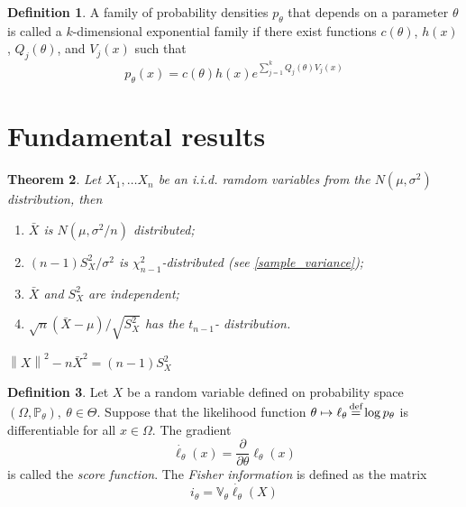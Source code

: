 \documentclass[12pt]{article}
\newtheorem{theorem}{Theorem}[section]
\theoremstyle{definition}
\newtheorem{definition}[theorem]{Definition}
\theoremstyle{remark}
\numberwithin{equation}{section}
\newcommand{\PP}{\mathbb{P}}
\newcommand{\VV}{\mathbb{V}}
\newcommand{\eq}{\stackrel{\mathclap{\normalfont\text{def}}}{=}}
\begin{document}
\begin{definition}\label{exponential_family}
	A family of probability densities $p_\theta$ that depends on a parameter $\theta$ is called a $k$-dimensional exponential family if there exist functions $c(\theta)$, $h(x)$, $Q_j(\theta)$, and $V_j(x)$ such that
	\begin{equation*}
		p_\theta(x) = c(\theta)h(x)e^{\sum_{j=1}^k Q_j(\theta)V_j(x)}
	\end{equation*}
\end{definition}

\section{Fundamental results}

\begin{theorem}\label{normaliid}
	Let $X_1,\ldots X_n$ be an i.i.d. ramdom variables from the $N(\mu, \sigma^2)$ distribution, then
	\begin{enumerate}
		\item $\bar X$ is $N(\mu, \sigma^2/n)$ distributed;
		\item $(n-1)S_X^2/\sigma^2$ is $\chi^2_{n-1}$-distributed (see \ref{sample_variance});
		\item $\bar X$ and $S^2_{X}$ are independent;
		\item $\sqrt{n}(\bar{X} - \mu)/\sqrt{S_X^2}$ has the $t_{n-1}$- distribution.
	\end{enumerate}
\end{theorem}
\proof $\left\|X\right\|^2 - n \bar{X}^2 = (n-1)S_X^2$

\begin{definition}\label{information_def}
Let $X$ be a random variable defined on probability space $(\Omega,\PP_\theta),\ \theta\in\Theta$. Suppose that the likelihood function $\theta\mapsto\ell_\theta \eq \log p_\theta$ is differentiable for all $x\in\Omega$. The gradient
\begin{equation*}
	\dot{\ell_\theta}(x) = \frac{\partial}{\partial\theta}\ell_\theta(x)
\end{equation*}
is called the \emph{score function}. The \emph{Fisher information} is defined as the matrix
\begin{equation*}
	i_\theta = \VV_\theta\dot{\ell_\theta}(X)
\end{equation*}
\end{definition}
\end{document}
